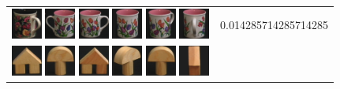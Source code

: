 \begin{figure}[tbp]
\begin{tabular}{m{11cm} | m{3cm} |}
\includegraphics[width=1cm]{coil/beeld-64.eps}
\includegraphics[width=1cm]{coil/beeld-7.eps}
\includegraphics[width=1cm]{coil/beeld-6.eps}
\includegraphics[width=1cm]{coil/beeld-8.eps}
\includegraphics[width=1cm]{coil/beeld-9.eps}
\includegraphics[width=1cm]{coil/beeld-11.eps}
& {\scriptsize 0.014285714285714285}
\\
\includegraphics[width=1cm]{coil/beeld-42.eps}
\includegraphics[width=1cm]{coil/beeld-0.eps}
\includegraphics[width=1cm]{coil/beeld-43.eps}
\includegraphics[width=1cm]{coil/beeld-3.eps}
\includegraphics[width=1cm]{coil/beeld-1.eps}
\includegraphics[width=1cm]{coil/beeld-44.eps}

\end{tabular}
\end{figure}
